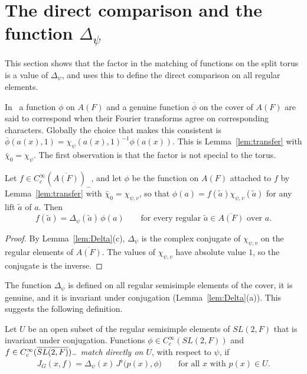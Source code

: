\section{The direct comparison and the function
\texorpdfstring{$\Delta_\psi$}{Delta\_psi}}\label{sec:direct}

This section shows that the factor in the matching of functions on the
split torus is a value of $\Delta_\psi$, and uses this to define the
direct comparison on all regular elements.

In~\cite{JC26} a function $\phi$ on $A(F)$ and a genuine function
$\overline\phi$ on the cover of $A(F)$ are said to correspond when their
Fourier transforms agree on corresponding characters. Globally the
choice that makes this consistent is $\overline\phi(a(x),1)=
\chi_{\psi}(a(x),1)^{-1}\phi(a(x))$. This is Lemma~\ref{lem:transfer} with
$\bar\chi_0=\chi_\psi$. The first observation is that the factor is not
special to the torus.

\begin{lemma}\label{lem:direct-torus}
Let $f\in C_c^\infty(\overline{A(F)})_-$, and let $\phi$ be the function
on $A(F)$ attached to $f$ by Lemma~\ref{lem:transfer} with
$\bar\chi_0=\chi_{\psi,v}$, so that $\phi(a)=f(\tilde a)\chi_{\psi,v}(
\tilde a)$ for any lift $\tilde a$ of $a$. Then
\[
f(\tilde a)=\Delta_\psi(\tilde a)\,\phi(a)\qquad\text{for every regular }
\tilde a\in\overline{A(F)}\text{ over }a .
\]
\end{lemma}

\begin{proof}
By Lemma~\ref{lem:Delta}(c), $\Delta_\psi$ is the complex conjugate of
$\chi_{\psi,v}$ on the regular elements of $\overline{A(F)}$. The values
of $\chi_{\psi,v}$ have absolute value $1$, so the conjugate is the
inverse.
\end{proof}

The function $\Delta_\psi$ is defined on all regular semisimple elements
of the cover, it is genuine, and it is invariant under conjugation
(Lemma~\ref{lem:Delta}(a)). This suggests the following definition.

\begin{definition}\label{def:direct}
Let $U$ be an open subset of the regular semisimple elements of
$SL(2,F)$ that is invariant under conjugation. Functions $\phi\in
C_c^\infty(SL(2,F))$ and $f\in C_c^\infty(\overline{SL(2,F)})_-$ \emph{match directly on
$U$}, with respect to $\psi$, if
\[
J_G(x,f)=\Delta_\psi(x)\,J^\flat\bigl(p(x),\phi\bigr)\qquad\text{for all }x
\text{ with }p(x)\in U .
\]
\end{definition}

